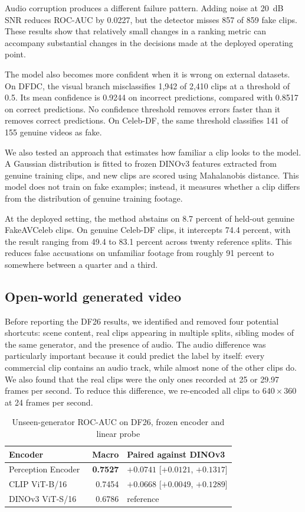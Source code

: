 \documentclass[conference]{IEEEtran}
\begin{document}
Audio corruption produces a different failure pattern. Adding noise at
20~dB SNR reduces ROC-AUC by 0.0227, but the detector misses 857 of 859
fake clips. These results show that relatively small changes in a ranking
metric can accompany substantial changes in the decisions made at the
deployed operating point.

The model also becomes more confident when it is wrong on external datasets.
On DFDC, the visual branch misclassifies 1,942 of 2,410 clips at a threshold
of 0.5. Its mean confidence is 0.9244 on incorrect predictions, compared
with 0.8517 on correct predictions. No confidence threshold removes errors
faster than it removes correct predictions. On Celeb-DF, the same threshold
classifies 141 of 155 genuine videos as fake.

We also tested an approach that estimates how familiar a clip looks to the
model. A Gaussian distribution is fitted to frozen DINOv3 features extracted
from genuine training clips, and new clips are scored using Mahalanobis
distance. This model does not train on fake examples; instead, it measures
whether a clip differs from the distribution of genuine training footage.

At the deployed setting, the method abstains on 8.7 percent of held-out
genuine FakeAVCeleb clips. On genuine Celeb-DF clips, it intercepts
74.4 percent, with the result ranging from 49.4 to 83.1 percent across
twenty reference splits. This reduces false accusations on unfamiliar
footage from roughly 91 percent to somewhere between a quarter and a third.

\subsection{Open-world generated video}

Before reporting the DF26 results, we identified and removed four potential
shortcuts: scene content, real clips appearing in multiple splits, sibling
modes of the same generator, and the presence of audio. The audio difference
was particularly important because it could predict the label by itself:
every commercial clip contains an audio track, while almost none of the
other clips do. We also found that the real clips were the only ones recorded
at 25 or 29.97 frames per second. To reduce this difference, we re-encoded
all clips to $640\times360$ at 24 frames per second.

\begin{table}[htbp]
\caption{Unseen-generator ROC-AUC on DF26, frozen encoder and linear probe}
\label{tab:df26}
\centering
\begin{tabular}{lrl}
\toprule
Encoder & Macro & Paired against DINOv3 \\
\midrule
Perception Encoder~\cite{pe} & \textbf{0.7527} & $+0.0741$ [$+0.0121$, $+0.1317$] \\
CLIP ViT-B/16~\cite{clip} & 0.7454 & $+0.0668$ [$+0.0049$, $+0.1289$] \\
DINOv3 ViT-S/16 & 0.6786 & reference \\
\bottomrule
\end{tabular}
\end{table}
\end{document}
